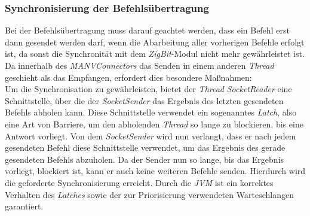 \subsubsection{Synchronisierung der Befehlsübertragung}
Bei der Befehlsübertragung muss darauf geachtet werden, dass ein Befehl erst dann gesendet werden darf,
wenn die Abarbeitung aller vorherigen Befehle erfolgt ist, da sonst die Synchronität mit dem \emph{ZigBit}-Modul
nicht mehr gewährleistet ist. Da innerhalb des \emph{MANVConnectors} das Senden in einem anderen \emph{Thread} geschieht
als das Empfangen, erfordert dies besondere Maßnahmen:\\
Um die Synchronisation zu gewährleisten, bietet der \emph{Thread} \emph{SocketReader} eine Schnittstelle, über die der
\emph{SocketSender} das Ergebnis des letzten gesendeten Befehls abholen kann. Diese Schnittstelle verwendet ein sogenanntes
\emph{Latch}, also eine Art von Barriere, um den abholenden \emph{Thread} so lange zu blockieren, bis eine Antwort vorliegt.
Von dem \emph{SocketSender} wird nun verlangt, dass er nach jedem gesendeten Befehl diese Schnittstelle verwendet,
um das Ergebnis des gerade gesendeten Befehls abzuholen. Da der Sender nun so lange, bis das Ergebnis vorliegt, blockiert ist,
kann er auch keine weiteren Befehle senden. Hierdurch wird die geforderte Synchronisierung erreicht. Durch die \emph{JVM}
ist ein korrektes Verhalten des \emph{Latches} sowie der zur Priorisierung verwendeten Warteschlangen garantiert.
